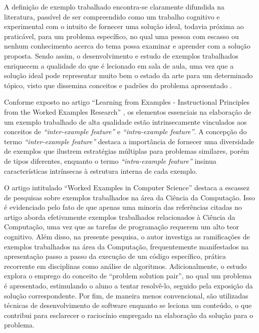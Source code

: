 A definição de exemplo trabalhado encontra-se claramente difundida na literatura, passível de ser compreendido como um trabalho cognitivo e experimental com o intuito de fornecer uma solução ideal, todavia próxima ao praticável, para um problema específico, no qual uma pessoa com escasso ou nenhum conhecimento acerca do tema possa examinar e aprender com a solução proposta. Sendo assim, o desenvolvimento e estudo de exemplos trabalhados enriquecem a qualidade do que é lecionado em sala de aula, uma vez que a solução ideal pode representar muito bem o estado da arte para um determinado tópico, visto que dissemina conceitos e padrões do problema apresentado \cite{Robert.Atkinson-etal:2000}.

Conforme exposto no artigo ``Learning from Examples - Instructional Principles from the Worked Examples Research'' \cite{Robert.Atkinson-etal:2000}, os elementos essenciais na elaboração de um exemplo trabalhado de alta qualidade estão intrinsecamente vinculados aos conceitos de \textit{``inter-example feature''} e \textit{``intra-example feature''}. A concepção do termo \textit{``inter-example feature''} destaca a importância de fornecer uma diversidade de exemplos que ilustrem estratégias múltiplas para problemas similares, porém de tipos diferentes, enquanto o termo \textit{``intra-example feature''} insinua características intrínsecas à estrutura interna de cada exemplo. 

O artigo intitulado ``Worked Examples in Computer Science'' \cite{Skudder-LuxtonReilly:2014} destaca a escassez de pesquisas sobre exemplos trabalhados na área da Ciência da Computação. Isso é evidenciado pelo fato de que apenas uma minoria das referências citadas no artigo aborda efetivamente exemplos trabalhados relacionados à Ciência da Computação, uma vez que as tarefas de programação requerem um alto teor cognitivo. Além disso, na presente pesquisa, o autor investiga as ramificações de exemplos trabalhados na área da Computação, frequentemente manifestados na apresentação passo a passo da execução de um código específico, prática recorrente em disciplinas como análise de algoritmos. Adicionalmente, o estudo explora o emprego do conceito de ``problem solution pair'', no qual um problema é apresentado, estimulando o aluno a tentar resolvê-lo, seguido pela exposição da solução correspondente. Por fim, de maneira menos convencional, são utilizadas técnicas de desenvolvimento de software enquanto se leciona um conteúdo, o que contribui para esclarecer o raciocínio empregado na elaboração da solução para o problema.

